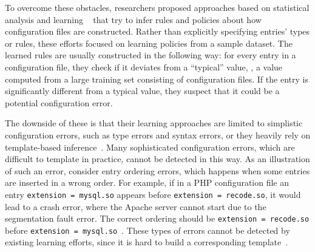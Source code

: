 To overcome these obstacles, researchers proposed approaches based on
statistical analysis and learning%
~\cite{wang04automatic, zhang14encore, yuan11context}
that try to infer rules and policies about 
how configuration files are constructed.
Rather than explicitly specifying entries' types or rules, 
these efforts focused on learning policies from a sample dataset.
The learned rules are usually constructed in the following way: 
for every entry in a configuration file, 
they check if it deviates from a ``typical'' value, \ie, 
a value computed from a large training set 
consisting of configuration files.
If the entry is significantly different from a typical value, 
they suspect that it could be a potential configuration error.

The downside of these is that their learning approaches 
are limited to simplistic configuration errors, 
such as type errors and syntax errors, or they 
heavily rely on template-based inference~\cite{zhang14encore}. 
Many sophisticated configuration errors, 
which are difficult to template in practice, 
cannot be detected in this way. 
As an illustration of such an error, consider entry ordering errors, 
which happens when some entries are inserted in a wrong order. 
For example, if in a PHP configuration file 
an entry {\tt extension = mysql.so} appears 
before {\tt extension = recode.so},  
it would lead to a crash error, where the Apache server cannot start 
due to the segmentation fault error. The correct ordering 
should be {\tt extension = recode.so} before 
{\tt extension = mysql.so}~\cite{yin11anempirical}.
These types of errors cannot be detected by existing
learning efforts, 
since it is hard to build a corresponding template~\cite{xu15systems}. 



